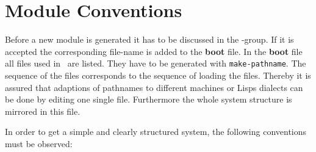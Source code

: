 \section{Module Conventions}
\label{module-conventions}

Before a new module is generated it has to be discussed in the
\keim-group. If it is accepted the corresponding file-name is added to
the {\bf boot} file.  In the {\bf boot} file all files used in \keim\
are listed. They have to be generated with {\tt make-pathname}. The
sequence of the files corresponds to the sequence of loading the files.
Thereby it is assured that adaptions of pathnames to different
machines or Lisps dialects can be done by editing one single file.
Furthermore the whole system structure is mirrored in this file.

In order to get a simple and clearly structured system, the following
conventions must be observed:

